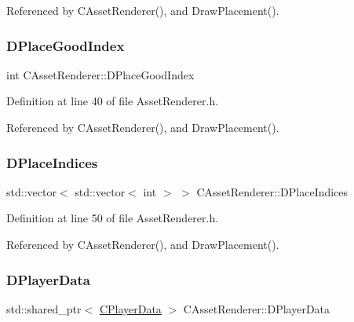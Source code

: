 Referenced by C\+Asset\+Renderer(), and Draw\+Placement().

\hypertarget{classCAssetRenderer_a2bf69fa52909e0daccd3b3afc8c79119}{}\label{classCAssetRenderer_a2bf69fa52909e0daccd3b3afc8c79119} 
\subsubsection{\texorpdfstring{D\+Place\+Good\+Index}{DPlaceGoodIndex}}
{\footnotesize\ttfamily int C\+Asset\+Renderer\+::\+D\+Place\+Good\+Index\hspace{0.3cm}{\ttfamily [protected]}}



Definition at line 40 of file Asset\+Renderer.\+h.



Referenced by C\+Asset\+Renderer(), and Draw\+Placement().

\hypertarget{classCAssetRenderer_a5d20fe39b33a35847b7332b46cfbf3c6}{}\label{classCAssetRenderer_a5d20fe39b33a35847b7332b46cfbf3c6} 
\subsubsection{\texorpdfstring{D\+Place\+Indices}{DPlaceIndices}}
{\footnotesize\ttfamily std\+::vector$<$ std\+::vector$<$ int $>$ $>$ C\+Asset\+Renderer\+::\+D\+Place\+Indices\hspace{0.3cm}{\ttfamily [protected]}}



Definition at line 50 of file Asset\+Renderer.\+h.



Referenced by C\+Asset\+Renderer(), and Draw\+Placement().

\hypertarget{classCAssetRenderer_ae0f36013db2ef04b08b74d92249c1af5}{}\label{classCAssetRenderer_ae0f36013db2ef04b08b74d92249c1af5} 
\subsubsection{\texorpdfstring{D\+Player\+Data}{DPlayerData}}
{\footnotesize\ttfamily std\+::shared\+\_\+ptr$<$ \hyperlink{classCPlayerData}{C\+Player\+Data} $>$ C\+Asset\+Renderer\+::\+D\+Player\+Data\hspace{0.3cm}{\ttfamily [protected]}}



